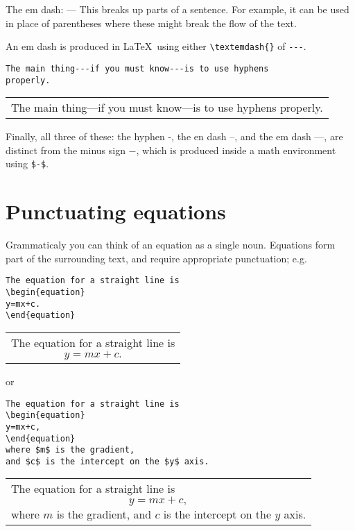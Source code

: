 \documentclass[a4paper]{tufte-handout}
\begin{document}
The em dash: --- This breaks up parts of a sentence. For example, it can be used in place of parentheses where these might break the flow of the text.

An em dash is produced in \LaTeX\ using either \lstinline$\textemdash{}$ of \lstinline{---}.
 \begin{lstlisting}
The main thing---if you must know---is to use hyphens
properly.
\end{lstlisting}
\begin{tabular}{|p{10cm}}
The main thing---if you must know---is to use hyphens
properly.
\end{tabular}

Finally, all three of these: the hyphen -, the en dash --, and the em dash ---, are distinct from the minus sign $-$, which is produced inside a math environment using \lstinline{$-$}.


\section{Punctuating equations} 
Grammaticaly you can think of an equation as a single noun. Equations form part of the surrounding text, and require appropriate punctuation; e.g.
\begin{lstlisting}
The equation for a straight line is
\begin{equation}
y=mx+c.
\end{equation}
\end{lstlisting}
\begin{tabular}{|p{10cm}}
The equation for a straight line is
\begin{equation*}
y=mx+c.
\end{equation*}
\end{tabular}

or

\begin{lstlisting}
The equation for a straight line is
\begin{equation}
y=mx+c,
\end{equation}
where $m$ is the gradient, 
and $c$ is the intercept on the $y$ axis.
\end{lstlisting}
\begin{tabular}{|p{10cm}}
The equation for a straight line is
\begin{equation*}
y=mx+c,
\end{equation*}
where $m$ is the gradient, 
and $c$ is the intercept on the $y$ axis.
\end{tabular}
\end{document}
